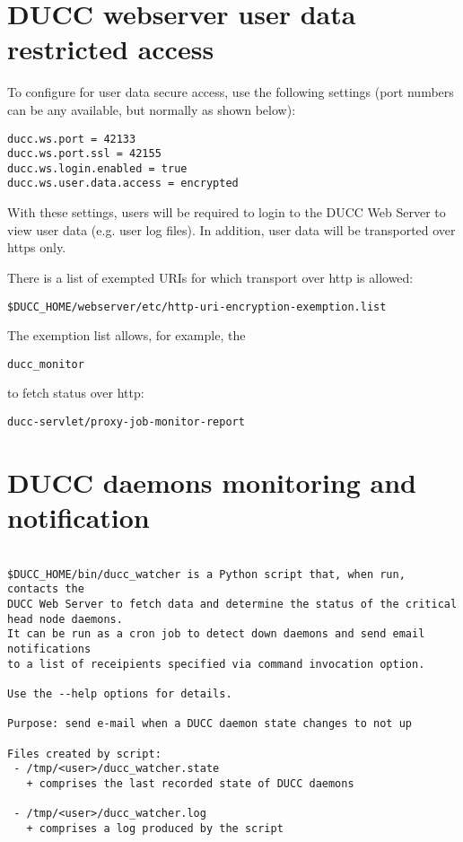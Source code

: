 \section{DUCC webserver user data restricted access}

To configure for user data secure access, use the following settings
(port numbers can be any available, but normally as shown below):

\begin{verbatim} 
ducc.ws.port = 42133
ducc.ws.port.ssl = 42155
ducc.ws.login.enabled = true
ducc.ws.user.data.access = encrypted
\end{verbatim}

With these settings, users will be required to login to the DUCC
Web Server to view user data (e.g. user log files).  
In addition, user data will be transported over https only.

There is a list of exempted URIs for which transport over http 
is allowed: 

\begin{verbatim} 
$DUCC_HOME/webserver/etc/http-uri-encryption-exemption.list
\end{verbatim}

The exemption list allows, for example, the 
\begin{verbatim} 
ducc_monitor
\end{verbatim}
to fetch status over http:

\begin{verbatim} 
ducc-servlet/proxy-job-monitor-report
\end{verbatim}

\section{DUCC daemons monitoring and notification}

\begin{verbatim}

$DUCC_HOME/bin/ducc_watcher is a Python script that, when run, contacts the 
DUCC Web Server to fetch data and determine the status of the critical head node daemons.
It can be run as a cron job to detect down daemons and send email notifications
to a list of receipients specified via command invocation option.

Use the --help options for details.

Purpose: send e-mail when a DUCC daemon state changes to not up

Files created by script:
 - /tmp/<user>/ducc_watcher.state
   + comprises the last recorded state of DUCC daemons

 - /tmp/<user>/ducc_watcher.log
   + comprises a log produced by the script
      
\end{verbatim}
